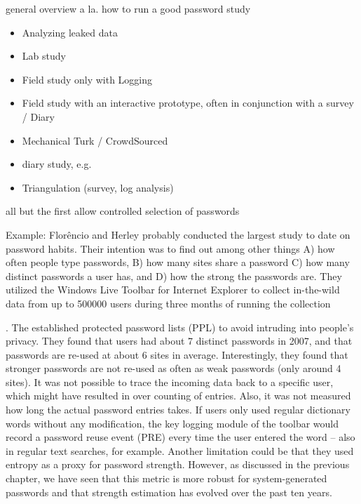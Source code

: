 general overview a la. how to run a good password study 

\cite{Krol2016ExperimentDesign,Peer2017,Consolvo2003,Ross2010,Sotirakopoulos2011,Oppenheimer2009InstructionalManipulationChecks,Harbach2016HardLockLife,Barbera2013,Carreras2013,Chamberlain2012ResearchInTheWild,Henze2013EmpiricalResearchUbiquitous,Kuhn1993,VonZezschwitz2013SurvivalShortest,Hassenzahl2003,Mazurek2013Measuring,Egelman2015a,Rosoff2014,Savage2012}

\begin{itemize}
	\item Analyzing leaked data
	\item Lab study \cite{Sotirakopoulos2011}
	\item Field study only with Logging \cite{Florencio2007LargeScaleStudyPasswordHabits}
	\item Field study with an interactive prototype, often in conjunction with a survey / Diary 
	\item Mechanical Turk / CrowdSourced 
	\item diary study, e.g. \cite{Hayashi2011DiaryStudyPWs}
	\item Triangulation (survey, log analysis) \cite{Wash2016UnderstandingPasswordChoices}
\end{itemize}

all but the first allow controlled selection of passwords

Example: 
Flor\^{e}ncio and Herley probably conducted the largest study to date on password habits. Their intention was to find out among other things A) how often people type passwords, B) how many sites share a password C) how many distinct passwords a user has, and D) how the strong the passwords are. They utilized the Windows Live Toolbar for Internet Explorer to collect in-the-wild data from up to 500000 users during three months of running the collection

\cite{Florencio2007LargeScaleStudyPasswordHabits}. The established protected password lists (PPL) to avoid intruding into people's privacy. They found that users had about 7 distinct passwords in 2007, and that passwords are re-used at about 6 sites in average. Interestingly, they found that stronger passwords are not re-used as often as weak passwords (only around 4 sites). It was not possible to trace the incoming data back to a specific user, which might have resulted in over counting of entries. Also, it was not measured how long the actual password entries takes. If users only used regular dictionary words without any modification, the key logging module of the toolbar would record a password reuse event (PRE) every time the user entered the word -- also in regular text searches, for example. Another limitation could be that they used entropy as a proxy for password strength. However, as discussed in the previous chapter, we have seen that this metric is more robust for system-generated passwords and that strength estimation has evolved over the past ten years. 



